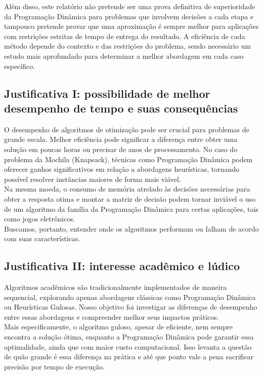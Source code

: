 \documentclass{article}
\begin{document}
    Além disso, este relatório não pretende ser uma prova definitiva de superioridade da Programação Dinâmica para problemas que involvem decisões a cada etapa e tampouco pretende provar que uma aproximação é sempre melhor para aplicações com restrições estritas de tempo de entrega do resultado. A eficiência de cada método depende do contexto e das restrições do problema, sendo necessário um estudo mais aprofundado para determinar a melhor abordagem em cada caso específico.

\subsection{Justificativa I: possibilidade de melhor desempenho de tempo e suas consequências}
    O desempenho de algoritmos de otimização pode ser crucial para problemas de grande escala. Melhor eficiência pode significar a diferença entre obter uma solução em poucas horas ou precisar de anos de processamento. No caso do problema da Mochila (Knapsack), técnicas como Programação Dinâmica podem oferecer ganhos significativos em relação a abordagens heurísticas, tornando possível resolver instâncias maiores de forma mais viável.\\

    Na mesma moeda, o consumo de memória atrelado às decisões necessárias para obter a resposta otima e montar a matriz de decisão podem tornar inviável o uso de um algoritmo da família da Programação Dinâmica para certas aplicações, tais como jogos eletrônicos.\\

    Buscamos, portanto, entender onde os algoritmos performam ou falham de acordo com suas características. 
    
\subsection{Justificativa II: interesse acadêmico e lúdico}
    Algoritmos acadêmicos são tradicionalmente implementados de maneira sequencial, explorando apenas abordagens clássicas como Programação Dinâmica ou Heurísticas Gulosas. Nosso objetivo foi investigar as diferenças de desempenho entre essas abordagens e compreender melhor seus impactos práticos.\\
    
    Mais especificamente, o algoritmo guloso, apesar de eficiente, nem sempre encontra a solução ótima, enquanto a Programação Dinâmica pode garantir essa optimalidade, ainda que com maior custo computacional. Isso levanta a questão de quão grande é essa diferença na prática e até que ponto vale a pena sacrificar precisão por tempo de execução.
\end{document}
